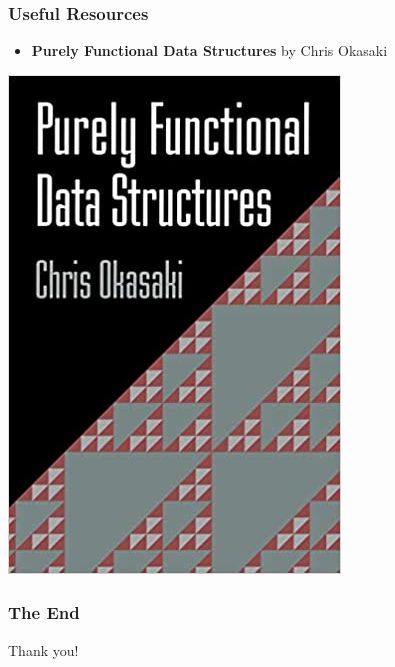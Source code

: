 \documentclass{beamer}
\begin{document}
\begin{frame}[fragile]
  \frametitle{Useful Resources}
  \begin{minipage}{0.6\textwidth}\raggedright
    \begin{itemize}
    \item \textbf{Purely Functional Data Structures} by Chris Okasaki
    \end{itemize}
  \end{minipage}
  \begin{minipage}{0.3\textwidth}
    \includegraphics[width=\linewidth]{pfds}
  \end{minipage}
\end{frame}

\begin{frame}
  \frametitle{The End}
  \begin{center}
    Thank you!
  \end{center}
\end{frame}
\end{document}
